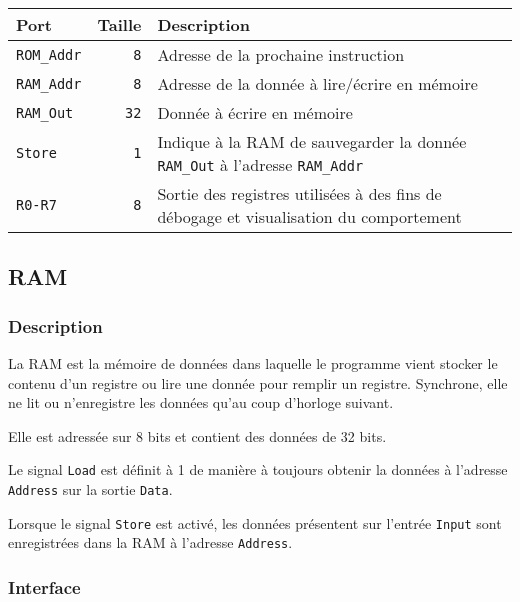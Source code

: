 
\begin{tabular}{|l|r|l|}
\hline 
\textbf{Port} & \textbf{Taille} & \textbf{Description}\\
\hline

\hline
\texttt{ROM\_Addr}		&  \texttt{8} & Adresse de la prochaine instruction\\
\hline
\texttt{RAM\_Addr}		&  \texttt{8} & Adresse de la donnée à lire/écrire en mémoire\\
\hline
\texttt{RAM\_Out}		& \texttt{32} & Donnée à écrire en mémoire\\
\hline
\texttt{Store}			&  \texttt{1} & Indique à la RAM de sauvegarder la donnée \texttt{RAM\_Out} à l'adresse \texttt{RAM\_Addr}\\
\hline
\texttt{R0-R7}			& \texttt{8\times 32} & Sortie des registres utilisées à des fins de débogage et visualisation du comportement\\


\hline
\end{tabular}



\subsection{RAM}

\subsubsection{Description}

La RAM est la mémoire de données dans laquelle le programme vient stocker le contenu d'un registre ou lire une donnée pour remplir un registre.
Synchrone, elle ne lit ou n'enregistre les données qu'au coup d'horloge suivant.

Elle est adressée sur 8 bits et contient des données de 32 bits.

Le signal \texttt{Load} est définit à 1 de manière à toujours obtenir la données à l'adresse \texttt{Address} sur la sortie \texttt{Data}.

Lorsque le signal \texttt{Store} est activé, les données présentent sur l'entrée \texttt{Input} sont enregistrées dans la RAM à l'adresse \texttt{Address}.

\subsubsection{Interface}

